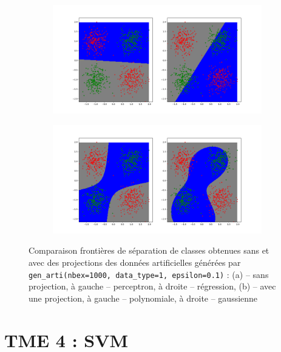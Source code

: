 \documentclass[a4paper,11pt]{article}
\theoremstyle{plain}
\theoremstyle{definition}
\begin{document}
\begin{figure}
    \centering
    \begin{subfigure}{1.0\textwidth}
    	\centering
    	\includegraphics{Figures/Figure_9.png}
    	\caption{}
    	\label{WithoutProjection}
    \end{subfigure}

    \begin{subfigure}{1.0\textwidth}
    	\centering
    	\includegraphics{Figures/Figure_10.png}
    	\caption{}
    	\label{WithProjection}
    \end{subfigure}
    \caption{Comparaison frontières de séparation de classes obtenues sans et avec des projections des données artificielles générées par \texttt{gen\_arti(nbex=1000, data\_type=1, epsilon=0.1)} : (a) -- sans projection, à gauche -- perceptron, à droite -- régression, (b) -- avec une projection, à gauche -- polynomiale, à droite -- gaussienne}
    \label{PolyGaussProjection}
\end{figure}

\section{TME 4 : SVM}
\label{tme4}
\end{document}
